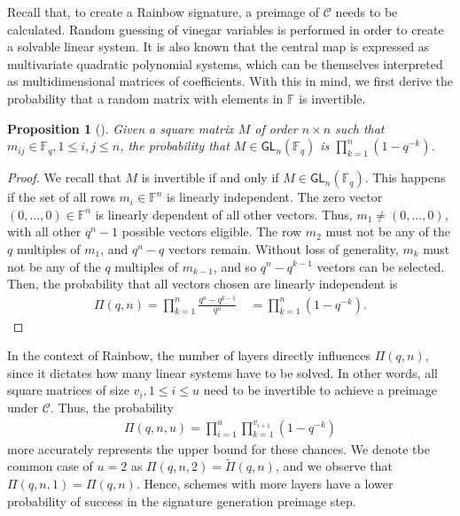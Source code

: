 \documentclass[12pt, a4paper, oneside]{memoir}
\newtheorem{proposition}[theorem]{Proposition}
\theoremstyle{definition}
\begin{document}
Recall that, to create a Rainbow signature, a preimage of $\mathcal{C}$ needs to be calculated. Random guessing of vinegar variables is performed in order to create a solvable linear system. It is also known that the central map is expressed as multivariate quadratic polynomial systems, which can be themselves interpreted as multidimensional matrices of coefficients. With this in mind, we first derive the probability that a random matrix with elements in $\mathbb{F}$ is invertible.

\begin{proposition}[{\cite[Remark~13.2.14]{Mullen:2013}}]
  Given a square matrix $M$ of order $n \times n$ such that $m_{ij} \in \mathbb{F}_{q}, 1 \leq i, j \leq n$, the probability that $M \in \mathsf{GL}_{n}(\mathbb{F}_{q})$ is $\prod_{k = 1}^{n} (1 - q^{-k})$.
\end{proposition}
\begin{proof}
  We recall that $M$ is invertible if and only if $M \in \mathsf{GL}_{n}(\mathbb{F}_{q})$. This happens if the set of all rows $m_{i} \in \mathbb{F}^{n}$ is linearly independent. The zero vector $(0, \dots, 0) \in \mathbb{F}^{n}$ is linearly dependent of all other vectors. Thus, $m_{1} \neq (0, \dots, 0)$, with all other $q^{n} - 1$ possible vectors eligible. The row $m_{2}$ must not be any of the $q$ multiples of $m_{1}$, and $q^{n} - q$ vectors remain. Without loss of generality, $m_{k}$ must not be any of the $q$ multiples of $m_{k - 1}$, and so $q^{n} - q^{k - 1}$ vectors can be selected. Then, the probability that all vectors chosen are linearly independent is
  \begin{align}
    \Pi(q, n) = \prod_{k = 1}^{n} \frac{q^{n} - q^{k - 1}}{q^{n}} \quad
      = \prod_{k = 1}^{n} (1 - q^{-k}).
  \end{align}
\end{proof}

In the context of Rainbow, the number of layers directly influences $\Pi(q, n)$, since it dictates how many linear systems have to be solved. In other words, all square matrices of size $v_{i}, 1 \leq i \leq u$ need to be invertible to achieve a preimage under $\mathcal{C}$. Thus, the probability
\begin{align}
  \Pi(q, n, u) = \prod_{i = 1}^{u} \prod_{k = 1}^{v_{i + 1}} (1 - q^{-k})
\end{align}
more accurately represents the upper bound for these chances. We denote tbe common case of $u = 2$ as $\Pi(q, n, 2) = \widetilde{\Pi}(q, n)$, and we observe that $\Pi(q, n, 1) = \Pi(q, n)$. Hence, schemes with more layers have a lower probability of success in the signature generation preimage step.
\end{document}
